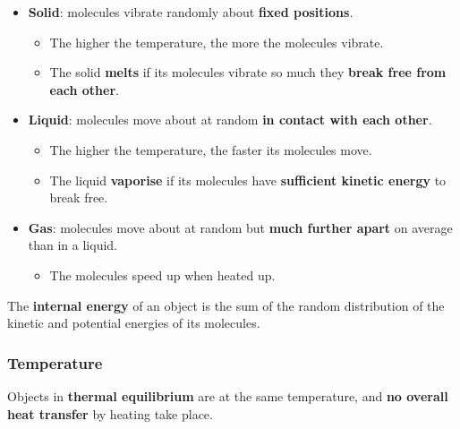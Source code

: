 \begin{itemize}
    \item \textbf{Solid}: molecules vibrate randomly about \textbf{fixed positions}.
        \begin{itemize}
            \item The higher the temperature, the more the molecules vibrate.
            \item The solid \textbf{melts} if its molecules vibrate so much they \textbf{break free from each other}.
        \end{itemize}
    \item \textbf{Liquid}: molecules move about at random \textbf{in contact with each other}.
        \begin{itemize}
            \item The higher the temperature, the faster its molecules move.
            \item The liquid \textbf{vaporise} if its molecules have \textbf{sufficient kinetic energy} to break free.
        \end{itemize}
    \item \textbf{Gas}: molecules move about at random but \textbf{much further apart} on average than in a liquid.
        \begin{itemize}
            \item The molecules speed up when heated up.
        \end{itemize}
\end{itemize}

The \textbf{internal energy} of an object is the sum of the random distribution of the kinetic and potential energies of its molecules.

\subsubsection*{Temperature}

Objects in \textbf{thermal equilibrium} are at the same temperature, and \textbf{no overall heat transfer} by heating take place.


